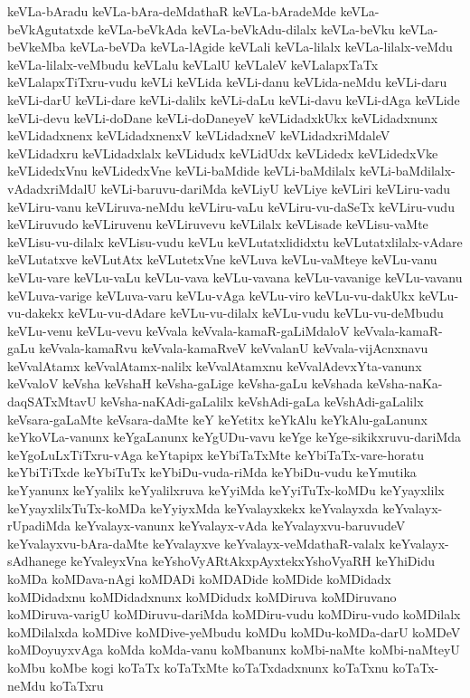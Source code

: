 {keVLa-bAradu
keVLa-bAra-deMdathaR
keVLa-bAradeMde
keVLa-beVkAgutatxde
keVLa-beVkAda
keVLa-beVkAdu-dilalx
keVLa-beVku
keVLa-beVkeMba
keVLa-beVDa
keVLa-lAgide
keVLali
keVLa-lilalx
keVLa-lilalx-veMdu
keVLa-lilalx-veMbudu
keVLalu
keVLalU
keVLaleV
keVLalapxTaTx
keVLalapxTiTxru-vudu
keVLi
keVLida
keVLi-danu
keVLida-neMdu
keVLi-daru
keVLi-darU
keVLi-dare
keVLi-dalilx
keVLi-daLu
keVLi-davu
keVLi-dAga
keVLide
keVLi-devu
keVLi-doDane
keVLi-doDaneyeV
keVLidadxkUkx
keVLidadxnunx
keVLidadxnenx
keVLidadxnenxV
keVLidadxneV
keVLidadxriMdaleV
keVLidadxru
keVLidadxlalx
keVLidudx
keVLidUdx
keVLidedx
keVLidedxVke
keVLidedxVnu
keVLidedxVne
keVLi-baMdide
keVLi-baMdilalx
keVLi-baMdilalx-vAdadxriMdalU
keVLi-baruvu-dariMda
keVLiyU
keVLiye
keVLiri
keVLiru-vadu
keVLiru-vanu
keVLiruva-neMdu
keVLiru-vaLu
keVLiru-vu-daSeTx
keVLiru-vudu
keVLiruvudo
keVLiruvenu
keVLiruvevu
keVLilalx
keVLisade
keVLisu-vaMte
keVLisu-vu-dilalx
keVLisu-vudu
keVLu
keVLutatxlididxtu
keVLutatxlilalx-vAdare
keVLutatxve
keVLutAtx
keVLutetxVne
keVLuva
keVLu-vaMteye
keVLu-vanu
keVLu-vare
keVLu-vaLu
keVLu-vava
keVLu-vavana
keVLu-vavanige
keVLu-vavanu
keVLuva-varige
keVLuva-varu
keVLu-vAga
keVLu-viro
keVLu-vu-dakUkx
keVLu-vu-dakekx
keVLu-vu-dAdare
keVLu-vu-dilalx
keVLu-vudu
keVLu-vu-deMbudu
keVLu-venu
keVLu-vevu
keVvala
keVvala-kamaR-gaLiMdaloV
keVvala-kamaR-gaLu
keVvala-kamaRvu
keVvala-kamaRveV
keVvalanU
keVvala-vijAcnxnavu
keVvalAtamx
keVvalAtamx-nalilx
keVvalAtamxnu
keVvalAdevxYta-vanunx
keVvaloV
keVsha
keVshaH
keVsha-gaLige
keVsha-gaLu
keVshada
keVsha-naKa-daqSATxMtavU
keVsha-naKAdi-gaLalilx
keVshAdi-gaLa
keVshAdi-gaLalilx
keVsara-gaLaMte
keVsara-daMte
keY
keYetitx
keYkAlu
keYkAlu-gaLanunx
keYkoVLa-vanunx
keYgaLanunx
keYgUDu-vavu
keYge
keYge-sikikxruvu-dariMda
keYgoLuLxTiTxru-vAga
keYtapipx
keYbiTaTxMte
keYbiTaTx-vare-horatu
keYbiTiTxde
keYbiTuTx
keYbiDu-vuda-riMda
keYbiDu-vudu
keYmutika
keYyanunx
keYyalilx
keYyalilxruva
keYyiMda
keYyiTuTx-koMDu
keYyayxlilx
keYyayxlilxTuTx-koMDa
keYyiyxMda
keYvalayxkekx
keYvalayxda
keYvalayx-rUpadiMda
keYvalayx-vanunx
keYvalayx-vAda
keYvalayxvu-baruvudeV
keYvalayxvu-bAra-daMte
keYvalayxve
keYvalayx-veMdathaR-valalx
keYvalayx-sAdhanege
keYvaleyxVna
keYshoVyARtAkxpAyxtekxYshoVyaRH
keYhiDidu
koMDa
koMDava-nAgi
koMDADi
koMDADide
koMDide
koMDidadx
koMDidadxnu
koMDidadxnunx
koMDidudx
koMDiruva
koMDiruvano
koMDiruva-varigU
koMDiruvu-dariMda
koMDiru-vudu
koMDiru-vudo
koMDilalx
koMDilalxda
koMDive
koMDive-yeMbudu
koMDu
koMDu-koMDa-darU
koMDeV
koMDoyuyxvAga
koMda
koMda-vanu
koMbanunx
koMbi-naMte
koMbi-naMteyU
koMbu
koMbe
kogi
koTaTx
koTaTxMte
koTaTxdadxnunx
koTaTxnu
koTaTx-neMdu
koTaTxru
}
